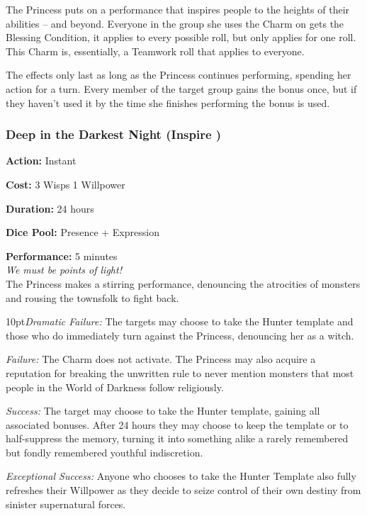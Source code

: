 The Princess puts on a performance that inspires people to the heights of their abilities -- and beyond. Everyone in the group she uses the Charm on gets the Blessing Condition, it applies to every possible roll, but only applies for one roll. This Charm is, essentially, a Teamwork roll that applies to everyone. 

The effects only last as long as the Princess continues performing, spending her action for a turn. Every member of the target group gains the bonus once, but if they haven't used it by the time she finishes performing the bonus is used.

\subsubsection*{Deep in the Darkest Night (Inspire \textbullet\textbullet\textbullet\textbullet\textbullet)}

\noindent \textbf{Action:} Instant

\noindent \textbf{Cost:} 3 Wisps 1 Willpower

\noindent \textbf{Duration:} 24 hours 

\noindent \textbf{Dice Pool:} Presence + Expression

\noindent \textbf{Performance:} 5 minutes \\

\noindent \textit{We must be points of light!}\\

\noindent The Princess makes a stirring performance, denouncing the atrocities of monsters and rousing the townsfolk to fight back.

\begin{myindentpar}{10pt}\emph{Dramatic Failure:} The targets may choose to take the Hunter template and those who do immediately turn against the Princess, denouncing her as a witch. 

    \emph{Failure:} The Charm does not activate. The Princess may also acquire a reputation for breaking the unwritten rule to never mention monsters that most people in the World of Darkness follow religiously. 

    \emph{Success:} The target may choose to take the Hunter template, gaining all associated bonuses. After 24 hours they may choose to keep the template or to half-suppress the memory, turning it into something alike a rarely remembered but fondly remembered youthful indiscretion. 

	\emph{Exceptional Success:} Anyone who chooses to take the Hunter Template also fully refreshes their Willpower as they decide to seize control of their own destiny from sinister supernatural forces.  

	\end{myindentpar}
	
